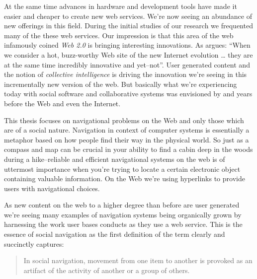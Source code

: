 At the same time advances in hardware and development tools have made it
easier and cheaper to create new web services. We're now seeing an
abundance of new offerings in this field.
During the initial studies of our research we frequented
many of the these web services. Our impression is that
this area of the web infamously coined \emph{Web 2.0}%
is bringing interesting innovations. As \citet[p.~18]{weiss05} argues:
``When we consider a hot, buzz-worthy Web site of the new Internet evolution
\ldots
they are at the same time incredibly innovative and yet--not''.
User generated content and the notion of \emph{collective intelligence} is
driving the innovation we're seeing in this incrementally new version of the
web. But basically what we're experiencing today with social software and
collaborative systems was envisioned by \citet{bush45} and
\citet{licklider68} years before the Web and even the Internet.

This thesis focuses on navigational problems on the Web and only those
which are of a social nature. Navigation in context of computer systems is
essentially a metaphor based on how people find their way in the physical
world. So just as a compass and map can be crucial in your ability to find a
cabin deep in the woods during a hike--reliable and efficient navigational
systems on the web is of uttermost importance when you're trying to locate a
certain electronic object containing valuable information. On the Web we're
using hyperlinks \citep[p.~90]{nelson65} to provide users with navigational
choices.

As new content on the web to a higher degree than before are user generated
we're seeing many examples of navigation systems being organically
grown by harnessing the work user bases conducts as they use a web service.
This is the essence of social navigation as the first definition of the term
clearly and succinctly captures:

\begin{quote}
In social navigation, movement from one item to another is provoked as an
artifact of the activity of another or a group of others. \citep{dourish94} 
\end{quote}

